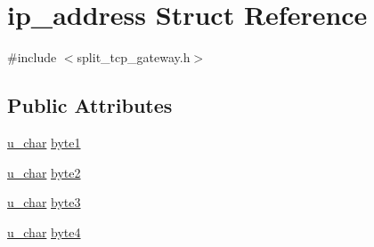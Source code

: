 \hypertarget{structip__address}{\section{ip\-\_\-address \-Struct \-Reference}
\label{structip__address}
}


{\ttfamily \#include $<$split\-\_\-tcp\-\_\-gateway.\-h$>$}

\subsection*{\-Public \-Attributes}
\begin{DoxyCompactItemize}
\item 
\hyperlink{split__tcp__gateway_8h_ae2b02ed168fc99cff3851603910b1fb6}{u\-\_\-char} \hyperlink{structip__address_a9829ac0f8b39812bb17cddc339289799}{byte1}
\item 
\hyperlink{split__tcp__gateway_8h_ae2b02ed168fc99cff3851603910b1fb6}{u\-\_\-char} \hyperlink{structip__address_a15fca759942b133e4ded44dd6893134e}{byte2}
\item 
\hyperlink{split__tcp__gateway_8h_ae2b02ed168fc99cff3851603910b1fb6}{u\-\_\-char} \hyperlink{structip__address_ab66ba09a8078bd76b2d94d3c473510c0}{byte3}
\item 
\hyperlink{split__tcp__gateway_8h_ae2b02ed168fc99cff3851603910b1fb6}{u\-\_\-char} \hyperlink{structip__address_af9371530b5b91215d12d5027a3caa1a1}{byte4}
\end{DoxyCompactItemize}


